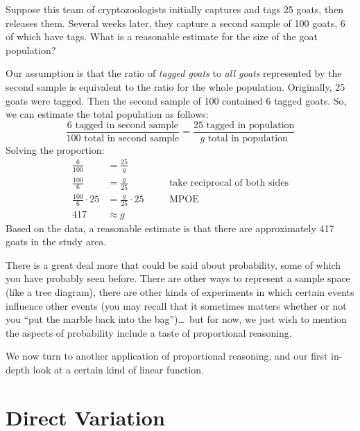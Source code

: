 \begin{boxedex}
Suppose this team of cryptozoologists initially captures and tags 25 goats, then releases them. Several weeks later, they capture a second sample of 100 goats, 6 of which have tags. What is a reasonable estimate for the size of the goat population?

\bigskip{} Our assumption is that the ratio of \textit{tagged goats} to \textit{all goats} represented by the second sample is equivalent to the ratio for the whole population. Originally, 25 goats were tagged. Then the second sample of 100 contained 6 tagged goats. So, we can estimate the total population as follows:
\[\frac{6\text{ tagged in second sample}}{100\text{ total in second sample}} = \frac{25\text{ tagged in population}}{g \text{ total in population}}\]
Solving the proportion:
\[\begin{aligned}
\frac{6}{100} &= \frac{25}{g}
\\[2ex]
\frac{100}{6} &= \frac{g}{25}
&&\quad\text{take reciprocal of both sides}
\\[2ex]
\frac{100}{6} \cdot 25 &= \frac{g}{25} \cdot 25
&&\quad\text{MPOE}
\\[2ex]
417 &\approx g
\end{aligned}\]
Based on the data, a reasonable estimate is that there are approximately 417 goats in the study area.
\end{boxedex}

There is a great deal more that could be said about probability, some of which you have probably seen before. There are other ways to represent a sample space  (like a tree diagram), there are other kinds of experiments in which certain events influence other events (you may recall that it sometimes matters whether or not you ``put the marble back into the bag'')\ldots\ but for now, we just wish to mention the aspects of probability include a taste of proportional reasoning.

We now turn to another application of proportional reasoning, and our first in-depth look at a certain kind of linear function.

\section{Direct Variation}
\label{sec:directvar}


